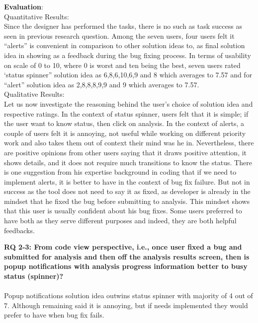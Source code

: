 \textbf{Evaluation}: \\

Quantitative Results: \\

Since the designer has performed the tasks, there is no such as task success as seen in previous research question. Among the seven users, four users felt it “alerts” is convenient in comparison to other solution ideas to, as final solution idea in showing as a feedback during the bug fixing process. In terms of usability on scale of 0 to 10, where 0 is worst and ten being the best, seven users rated ‘status spinner” solution idea as 6,8,6,10,6,9 and 8 which averages to 7.57 and for “alert” solution idea as 2,8,8,8,9,9 and 9 which averages to 7.57. \\

Qualitative Results: \\

Let us now investigate the reasoning behind the user’s choice of solution idea and respective ratings. In the context of status spinner, users felt that it is simple; if the user want to know status, then click on analysis. In the context of alerts, a couple of users felt it is annoying, not useful while working on different priority work and also takes them out of context their mind was he in. Nevertheless, there are positive opinions from other users saying that it draws positive attention, it shows details, and it does not require much transitions to know the status. There is one suggestion from his expertise background in coding that if we need to implement alerts, it is better to have in the context of bug fix failure. But not in success as the tool does not need to say it as fixed, as developer is already in the mindset that he fixed the bug before submitting to analysis. This mindset shows that this user is usually confident about his bug fixes. Some users preferred to have both as they serve different purposes and indeed, they are both helpful feedbacks. \\

\begin{myboxi}{{\textbf{RQ 2-3: From code view perspective, i.e., once user fixed a bug and submitted for analysis and then off the analysis results screen, then is popup notifications with analysis progress information better to busy status (spinner)?}}}
\\ \\	Popup notifications solution idea outwins status spinner with majority of 4 out of 7. Although remaining said it is annoying, but if needs implemented they would prefer to have when bug fix fails.
\end{myboxi}

